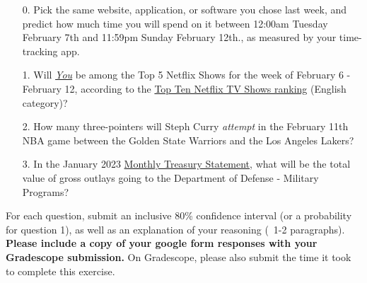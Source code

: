 \documentclass[11pt]{article}
\begin{document}
\begin{enumerate}
	\item[0.] Pick the same website, application, or software you chose last week, and predict how much time you will spend on it between 12:00am Tuesday February 7th and 11:59pm Sunday February 12th., as measured by your time-tracking app.

	\item[1.] Will \href{https://en.wikipedia.org/wiki/You_(TV_series)}{\emph{You}} be among the Top 5 Netflix Shows for the week of February 6 - February 12, according to the \href{https://top10.netflix.com/tv}{Top Ten Netflix TV Shows ranking} (English category)?
	
	\item[2.] How many three-pointers will Steph Curry \emph{attempt} in the February 11th NBA game between the Golden State Warriors and the Los Angeles Lakers?
 
	\item[3.] In the January 2023 \href{https://fiscal.treasury.gov/reports-statements/mts/}{Monthly Treasury Statement}, what will be the total value of gross outlays going to the Department of Defense - Military Programs?
	
\end{enumerate}

For each question, submit an inclusive 80\% confidence interval (or a probability for question 1), as well as an explanation of your reasoning (~1-2 paragraphs). \textbf{Please include a copy of your google form responses with your Gradescope submission.} On Gradescope, please also submit the time it took to complete this exercise.
\end{document}
